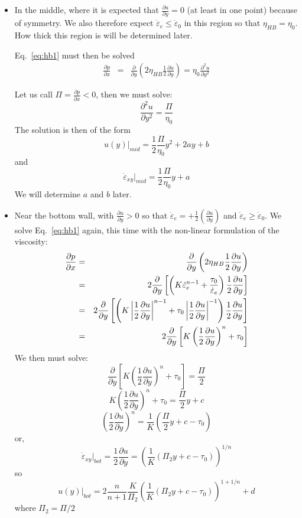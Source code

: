 \begin{itemize}

\item In the middle, where it is expected that $\frac{\partial u}{\partial y}=0$ (at least in one point)
because of symmetry. We also therefore expect $\dot{\varepsilon}_e\leq \dot{\varepsilon}_0$ in this region
so that $\eta_{HB}=\eta_0$. How thick this region is will be determined later. 

Eq.~\eqref{eq:hb1} must then be solved 
\begin{eqnarray}
\frac{\partial p}{\partial x}  
&=&\frac{\partial }{\partial y} \left(2\eta_{HB}  \frac{1}{2}\frac{\partial u}{\partial y} \right) 
= \eta_0 \frac{\partial^2 u}{\partial y^2}  
\end{eqnarray}

Let us call $\Pi=\frac{\partial p}{\partial x} <0$, then we must solve:
\[
\frac{\partial^2 u}{\partial y^2} = \frac{\Pi}{\eta_0} 
\]
The solution is then of the form
\[
\boxed{
u(y)|_{mid} = \frac{1}{2}\frac{\Pi}{\eta_0} y^2 + 2a y + b
}
\]
and 
\[
\boxed{
\dot{\varepsilon}_{xy}|_{mid}= \frac{1}{2} \frac{\Pi}{\eta_0}y  + a
}
\]
We will determine $a$ and $b$ later. 

\item Near the bottom wall, with $\frac{\partial u}{\partial y}>0$ so that  
$\dot{\varepsilon}_{e} = +\frac{1}{2}\left( \frac{\partial u}{\partial y}  \right)$  
and $\dot{\varepsilon}_e\geq \dot{\varepsilon}_0 $. 
We solve Eq.~\eqref{eq:hb1} again, this time with the non-linear formulation of the viscosity: 
\begin{eqnarray}
\frac{\partial p}{\partial x}  
&=&\frac{\partial }{\partial y} \left( 2 \eta_{HB}  \frac{1}{2}\frac{\partial u}{\partial y} \right)  \nonumber\\
&=&2 \frac{\partial }{\partial y} \left[  
\left( K  \dot{\varepsilon}_e^{n-1} + \frac{\tau_0}{\dot{\varepsilon}_e}  
\right) \frac{1}{2}\frac{\partial u}{\partial y} \right] \nonumber\\
&=&2\frac{\partial }{\partial y} \left[  
\left( K \left|\frac{1}{2}\frac{\partial u}{\partial y}\right|^{n-1} 
+ \tau_0 \left|\frac{1}{2}\frac{\partial u}{\partial y}\right|^{-1} 
\right) \frac{1}{2}\frac{\partial u}{\partial y} \right]  \nonumber\\
&=& 2 \frac{\partial }{\partial y} \left[  
K \left(\frac{1}{2}\frac{\partial u}{\partial y}\right)^{n} + \tau_0 \right] 
\end{eqnarray}
We then must solve:
\[
\frac{\partial }{\partial y} \left[  
K \left(\frac{1}{2}\frac{\partial u}{\partial y}\right)^{n} + \tau_0 \right] 
= \frac{\Pi}{2}
\]
\[
K \left(\frac{1}{2}\frac{\partial u}{\partial y}\right)^{n} + \tau_0  = \frac{\Pi}{2} y +c
\]
\[
\left(\frac{1}{2}\frac{\partial u}{\partial y}\right)^{n}   = \frac{1}{K} ( \frac{\Pi}{2} y +c -\tau_0 )
\]
or, 
\[
\boxed{
\dot{\varepsilon}_{xy}|_{bot}=
\frac{1}{2}\frac{\partial u}{\partial y}  = \left( \frac{1}{K} ( \Pi_2 y +c -\tau_0 ) \right)^{1/n}
}
\]
so 
\[
\boxed{
u(y)|_{bot} = 2 \frac{n}{n+1} \frac{K}{\Pi_2} \left( \frac{1}{K} ( \Pi_2 y +c -\tau_0 ) \right)^{1+1/n} + d
}
\]
where $\Pi_2=\Pi/2$


\end{itemize}
